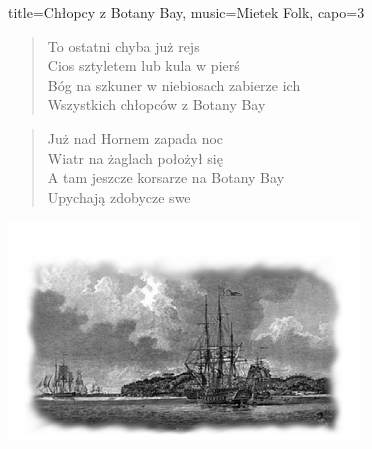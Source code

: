 \begin{song}{title={Chłopcy z Botany Bay}, music={Mietek Folk}, capo=3}
\begin{multicols}{2}
\begin{verse}
    \end{verse}
    \begin{verse}
        To ostatni chyba już rejs \\
        Cios sztyletem lub kula w pierś \\
        Bóg na szkuner w niebiosach zabierze ich \\
        Wszystkich chłopców z Botany Bay
    \end{verse}
    \begin{verse}
        Już nad Hornem zapada noc \\
        Wiatr na żaglach położył się \\
        A tam jeszcze korsarze na Botany Bay \\
        Upychają zdobycze swe
    \end{verse}
\end{multicols}
\begin{center}
\includegraphics[width=0.7\textwidth]{images/botany_bay.png}  
\end{center}
\end{song}

